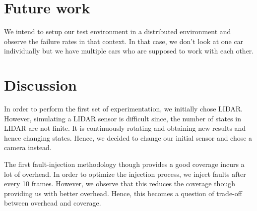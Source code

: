 \section{Future work}
We intend to setup our test environment in a distributed environment and observe the failure rates in that context. In that case, we don't look at one car individually but we have multiple cars who are supposed to work with each other. 
\section{Discussion}
In order to perform the first set of experimentation, we initially chose LIDAR. However, simulating a LIDAR sensor is difficult since, the number of states in LIDAR are not finite. It is continuously rotating and obtaining new results and hence changing states. Hence, we decided to change our initial sensor and chose a camera instead.

The first fault-injection methodology though provides a good coverage incurs a lot of overhead. In order to optimize the injection process, we inject faults after every 10 frames. However, we observe that this reduces the coverage though providing us with better overhead. Hence, this becomes a question of trade-off between overhead and coverage. 


